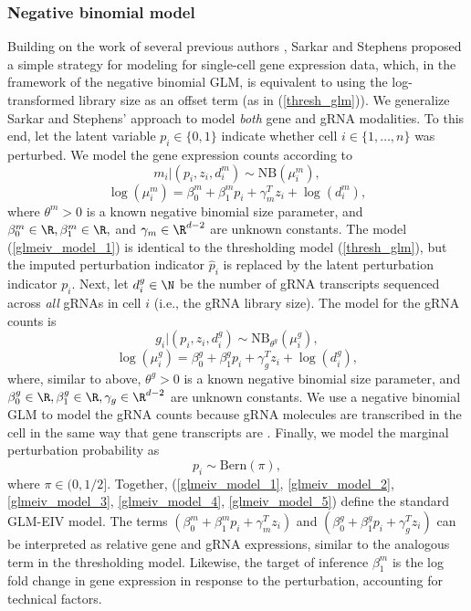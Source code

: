 \documentclass[12pt]{article}
\begin{document}
\subsubsection*{Negative binomial model}
Building on the work of several previous authors \cite{Townes2019,Svensson2020,Hafemeister2019}, Sarkar and Stephens \cite{Sarkar2021} proposed a simple strategy for modeling for single-cell gene expression data, which, in the framework of the negative binomial GLM, is equivalent to using the log-transformed library size as an offset term (as in (\ref{thresh_glm})). We generalize Sarkar and Stephens' approach to model \textit{both} gene and gRNA modalities. To this end, let the latent variable $p_i \in \{0,1\}$ indicate whether cell $i \in \{1, \dots, n\}$ was perturbed. We model the gene expression counts according to
\begin{equation}\label{glmeiv_model_1}
m_i |(p_i, z_i, d^m_i) \sim \textrm{NB}(\mu_i^m),
\end{equation}
\begin{equation}\label{glmeiv_model_2}
\log(\mu^m_i) = \beta^m_0 + \beta^m_1 p_i + \gamma_m^T z_i + \log(d^m_i),
\end{equation}
where $\theta^m > 0$ is a known negative binomial size parameter, and $\beta^m_0 \in \R, \beta^m_1 \in \R,$ and $\gamma_m \in \R^{d - 2}$ are unknown constants. The model (\ref{glmeiv_model_1}) is identical to the thresholding model (\ref{thresh_glm}), but the imputed perturbation indicator $\hat{p}_i$ is replaced by the latent perturbation indicator $p_i$. Next, let $d^g_i \in \N$ be the number of gRNA transcripts sequenced across \textit{all} gRNAs in cell $i$ (i.e., the gRNA library size). The model for the gRNA counts is 
\begin{equation}\label{glmeiv_model_3}
g_i | (p_i, z_i, d^g_i) \sim \textrm{NB}_{\theta^g}\left(\mu_i^g\right),
\end{equation}
\begin{equation}\label{glmeiv_model_4}
\log(\mu_i^g) = \beta^g_0 + \beta^g_1p_i + \gamma^T_g z_i + \log(d^g_i),
\end{equation}
where, similar to above, $\theta^g > 0$ is a known negative binomial size parameter, and $\beta^g_0 \in \R, \beta^g_1 \in \R, \gamma_g \in \R^{d - 2}$ are unknown constants. We use a negative binomial GLM to model the gRNA counts because gRNA molecules are transcribed in the cell in the same way that gene transcripts are \cite{Datlinger2017,Hill2018}. Finally, we model the marginal perturbation probability as
\begin{equation}\label{glmeiv_model_5}
p_i \sim \textrm{Bern}(\pi),
\end{equation} where $\pi \in (0,1/2]$. 
 Together, (\ref{glmeiv_model_1}, \ref{glmeiv_model_2}, \ref{glmeiv_model_3}, \ref{glmeiv_model_4}, \ref{glmeiv_model_5}) define the standard GLM-EIV model. The terms $(\beta^m_0 + \beta^m_1p_i + \gamma^T_m z_i)$ and $(\beta^g_0 + \beta^g_1 p_i + \gamma^T_g z_i)$ can be interpreted as relative gene and gRNA expressions, similar to the analogous term in the thresholding model. Likewise, the target of inference $\beta^m_1$ is the log fold change in gene expression in response to the perturbation, accounting for technical factors.
 
\end{document}
